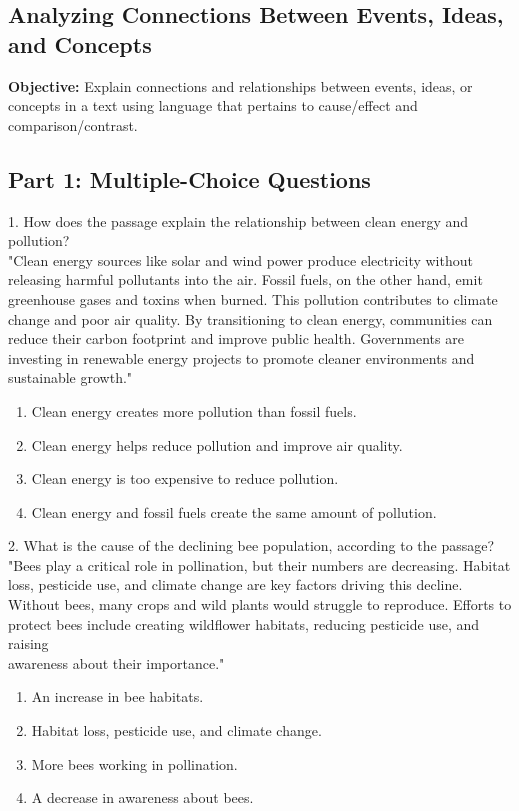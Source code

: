 \documentclass[12pt]{article}
\begin{document}
\subsection*{Analyzing Connections Between Events, Ideas, and Concepts}
\onehalfspacing

\begin{tcolorbox}[colframe=black!40, colback=gray!0, title=Learning Objective]
\textbf{Objective:} Explain connections and relationships between events, ideas, or concepts in a text using language that pertains to cause/effect and comparison/contrast.
\end{tcolorbox}

\subsection*{Part 1: Multiple-Choice Questions}

1. How does the passage explain the relationship between clean energy and pollution?\\
"Clean energy sources like solar and wind power produce electricity without releasing harmful pollutants into the air. Fossil fuels, on the other hand, emit greenhouse gases and toxins when burned. This pollution contributes to climate change and poor air quality. By transitioning to clean energy, communities can reduce their carbon footprint and improve public health. Governments are investing in renewable energy projects to promote cleaner environments and sustainable growth."\\
\begin{enumerate}[label=\Alph*.]
    \item Clean energy creates more pollution than fossil fuels.  
    \item Clean energy helps reduce pollution and improve air quality.  
    \item Clean energy is too expensive to reduce pollution.  
    \item Clean energy and fossil fuels create the same amount of pollution.  
\end{enumerate}

\vspace{1cm}

2. What is the cause of the declining bee population, according to the passage?\\
"Bees play a critical role in pollination, but their numbers are decreasing. Habitat loss, pesticide use, and climate change are key factors driving this decline. Without bees, many crops and wild plants would struggle to reproduce. Efforts to protect bees include creating wildflower habitats, reducing pesticide use, and raising \\awareness about their importance."\\
\begin{enumerate}[label=\Alph*.]
    \item An increase in bee habitats.  
    \item Habitat loss, pesticide use, and climate change.  
    \item More bees working in pollination.  
    \item A decrease in awareness about bees.  
\end{enumerate}
\end{document}
